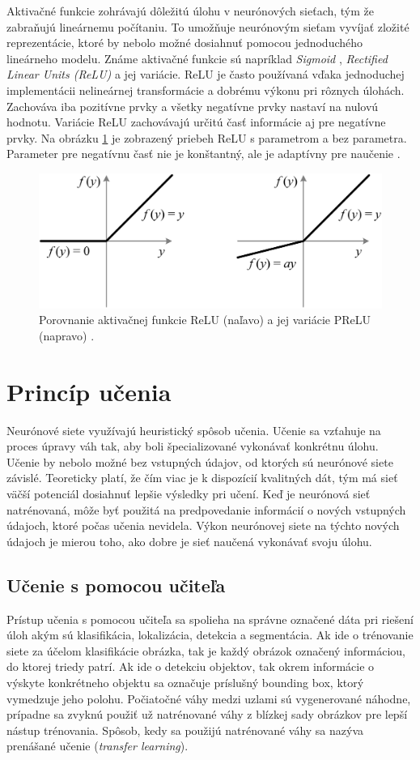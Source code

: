 Aktivačné funkcie zohrávajú dôležitú úlohu v neurónových sieťach, tým že zabraňujú lineárnemu počítaniu. To umožňuje neurónovým sieťam vyvíjať zložité reprezentácie, ktoré by nebolo možné dosiahnuť pomocou jednoduchého lineárneho modelu. Známe aktivačné funkcie sú napríklad \textit{Sigmoid} \cite{sigmoid}, \textit{Rectified Linear Units (ReLU)} \cite{relu} a jej variácie. ReLU je často používaná vďaka jednoduchej implementácii nelineárnej transformácie a dobrému výkonu pri rôznych úlohách. Zachováva iba pozitívne prvky a všetky negatívne prvky nastaví na nulovú hodnotu. Variácie ReLU zachovávajú určitú časť informácie aj pre negatívne prvky. Na obrázku \ref{img:rr} je zobrazený priebeh ReLU s parametrom a bez parametra. Parameter pre negatívnu časť nie je konštantný, ale je adaptívny pre naučenie \cite{prelu}.
\\
\begin{figure}[ht]
    \centering
    \includegraphics[width=.6\textwidth]{images/02/relu_prelu.png}
    \caption{Porovnanie aktivačnej funkcie ReLU (naľavo) a jej variácie PReLU (napravo) \cite{prelu}.}
    \label{img:rr}
\end{figure}

\section{Princíp učenia}

Neurónové siete využívajú heuristický spôsob učenia. Učenie sa vzťahuje na proces úpravy váh tak, aby boli špecializované vykonávať konkrétnu úlohu. Učenie by nebolo možné bez vstupných údajov, od ktorých sú neurónové siete závislé. Teoreticky platí, že čím viac je k dispozícií kvalitných dát, tým má sieť väčší potenciál dosiahnuť lepšie výsledky pri učení. Keď je neurónová sieť natrénovaná, môže byť použitá na predpovedanie informácií o nových vstupných údajoch, ktoré počas učenia nevidela. Výkon neurónovej siete na týchto nových údajoch je mierou toho, ako dobre je sieť naučená vykonávať svoju úlohu.

\subsection{Učenie s pomocou učiteľa}
Prístup učenia s pomocou učiteľa sa spolieha na správne označené dáta pri riešení úloh akým sú klasifikácia, lokalizácia, detekcia a segmentácia. Ak ide o trénovanie siete za účelom klasifikácie obrázka, tak je každý obrázok označený informáciou, do ktorej triedy patrí. Ak ide o detekciu objektov, tak okrem informácie o výskyte konkrétneho objektu sa označuje príslušný bounding box, ktorý vymedzuje jeho polohu. Počiatočné váhy medzi uzlami sú vygenerované náhodne, prípadne sa zvyknú použiť už natrénované váhy z blízkej sady obrázkov pre lepší nástup trénovania. Spôsob, kedy sa použijú natrénované váhy sa nazýva prenášané učenie (\textit{transfer learning}).

